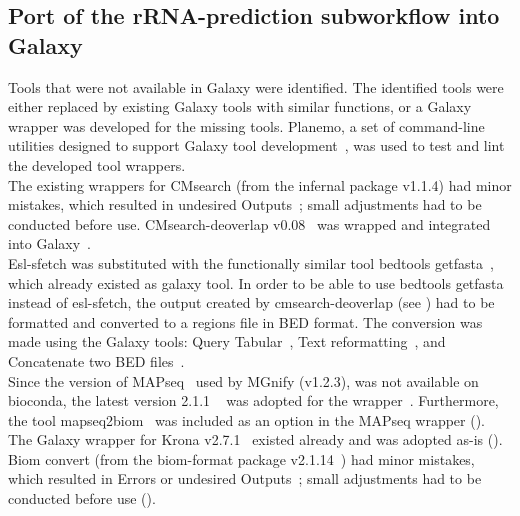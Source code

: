 \subsection{Port of the rRNA-prediction subworkflow into Galaxy}\label{subsec:Ingration_to_galaxy}
Tools that were not available in Galaxy were identified. The identified tools were either replaced by existing Galaxy tools with similar functions, or a Galaxy wrapper was developed for the missing tools. Planemo, a set of command-line utilities designed to support Galaxy tool development~\cite{noauthor_welcome_nodate}, was used to test and lint the developed tool wrappers.\\
The existing wrappers for CMsearch (from the infernal package v1.1.4) had minor mistakes, which resulted in undesired Outputs~\cite{gruning_galaxy_2023}; small adjustments had to be conducted before use. CMsearch-deoverlap v0.08~\cite{nawrocki_nawrockiecmsearch_tblout_deoverlap_2023} was wrapped and integrated into Galaxy~\cite{noauthor_galaxytoolstoolsrna_toolscmsearch_deoverlap_nodate}.\\
Esl-sfetch was substituted with the functionally similar tool bedtools getfasta~\cite{noauthor_tools-iuctoolsbedtools_nodate}, which already existed as galaxy tool. In order to be able to use bedtools getfasta instead of esl-sfetch, the output created by cmsearch-deoverlap (see ) had to be formatted and converted to a regions file in BED format. The conversion was made using the Galaxy tools: Query Tabular~\cite{noauthor_tools-iuctoolsquery_tabular_nodate}, Text reformatting~\cite{noauthor_galaxytoolstoolstext_processingtext_processing_nodate}, and Concatenate two BED files~\cite{noauthor_tools-devteamtool_collectionsgopsconcat_nodate}.\\
Since the version of MAPseq~\cite{rodrigues_mapseq_2023} used by MGnify (v1.2.3), was not available on bioconda, the latest version 2.1.1 ~\cite{noauthor_mapseq_nodate} was adopted for the wrapper~\cite{noauthor_tools-iuctoolsmapseq_nodate}. Furthermore, the tool mapseq2biom~\cite{noauthor_pipeline-v5toolsrna_predictionmapseq2biommapseq2biompl_nodate} was included as an option in the MAPseq wrapper ().\\
The Galaxy wrapper for Krona v2.7.1~\cite{noauthor_tools-iuctoolstaxonomy_krona_chart_nodate} existed already and was adopted as-is ().\\
 Biom convert (from the biom-format package v2.1.14~\cite{noauthor_tools-iuctoolsbiom_format_nodate}) had minor mistakes, which resulted in Errors or undesired Outputs~\cite{noauthor_galaxy_2023}; small adjustments had to be conducted before use ().\\


